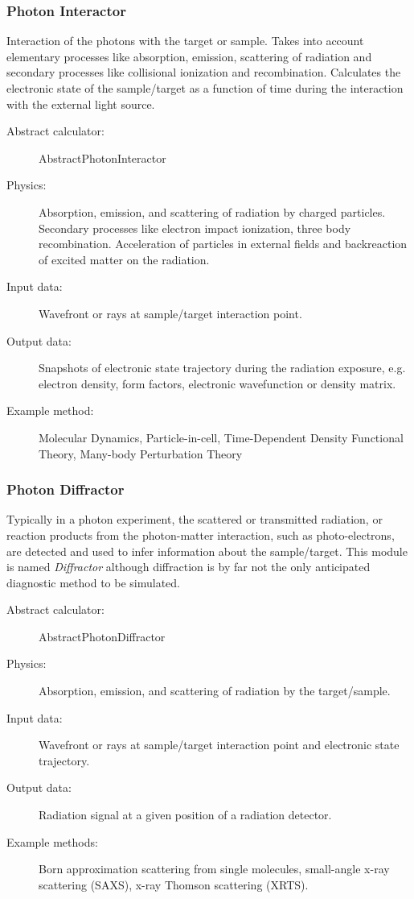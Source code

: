 \documentclass[a4paper]{article}
\begin{document}
\subsubsection{Photon Interactor}
Interaction of the photons with the target or sample. Takes into account elementary processes like absorption, emission,
scattering of radiation and secondary processes like collisional ionization and recombination. Calculates
the electronic state of the sample/target as a function of time during the interaction with the external light source.
\begin{description}
  \item[Abstract calculator:] AbstractPhotonInteractor
  \item[Physics:] Absorption, emission, and scattering of radiation by charged particles. Secondary processes like electron impact ionization, three
    body recombination. Acceleration of particles in external fields and backreaction of excited matter on the radiation.
  \item[Input data:] Wavefront or rays at sample/target interaction point.
  \item[Output data:] Snapshots of electronic state trajectory during the radiation exposure, e.g. electron density, form factors, electronic
    wavefunction or density matrix.
  \item[Example method:] Molecular Dynamics, Particle-in-cell, Time-Dependent Density Functional Theory, Many-body Perturbation
    Theory
\end{description}
%
\subsubsection{Photon Diffractor}
Typically in a photon experiment, the scattered or transmitted radiation, or reaction products from the photon-matter
interaction, such as photo-electrons, are detected and used to infer information about the sample/target.
This module is named \textit{Diffractor} although diffraction is by far not the only anticipated diagnostic method to be simulated.
\begin{description}
  \item[Abstract calculator:] AbstractPhotonDiffractor
  \item[Physics:] Absorption, emission, and scattering of radiation by the target/sample.
  \item[Input data:] Wavefront or rays at sample/target interaction point and electronic state trajectory.
  \item[Output data:] Radiation signal at a given position of a radiation detector.
  \item[Example methods:] Born approximation scattering from single molecules, small-angle x-ray scattering (SAXS), x-ray Thomson
    scattering (XRTS).
\end{description}
%
\end{document}
